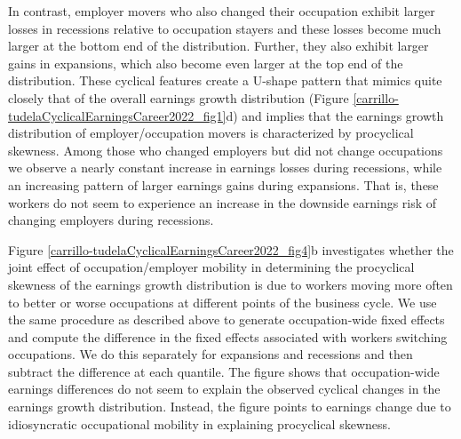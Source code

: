 \documentclass[12pt]{article}
\theoremstyle{definition}
\begin{document}
In contrast, employer movers who also changed their occupation exhibit larger losses in recessions relative to occupation stayers and these losses become much larger at the bottom end of the distribution. Further, they also exhibit larger gains in expansions, which also become even larger at the top end of the distribution. These cyclical features create a U-shape pattern that mimics quite closely that of the overall earnings growth distribution (Figure \ref{carrillo-tudelaCyclicalEarningsCareer2022_fig1}d) and implies that the earnings growth distribution of employer/occupation movers is characterized by procyclical skewness. Among those who changed employers but did not change occupations we observe a nearly constant increase in earnings losses during recessions, while an increasing pattern of larger earnings gains during expansions. That is, these workers do not seem to experience an increase in the downside earnings risk of changing employers during recessions.

Figure \ref{carrillo-tudelaCyclicalEarningsCareer2022_fig4}b investigates whether the joint effect of occupation/employer mobility in determining the procyclical skewness of the earnings growth distribution is due to workers moving more often  to better or worse occupations at different points of the business cycle. We use the same procedure as described above to generate occupation-wide fixed effects and compute the difference in the fixed effects associated with workers switching occupations. We do this separately for expansions and recessions and then subtract the difference at each quantile. The figure shows that occupation-wide earnings differences do not seem to explain the observed cyclical changes in the earnings growth distribution. Instead, the figure points to earnings change due to idiosyncratic occupational mobility in explaining procyclical skewness.
\end{document}
